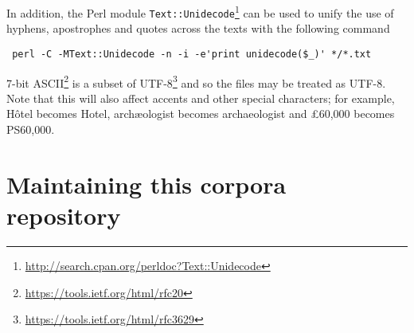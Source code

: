 \documentclass[a4paper,10pt]{paper}
\begin{document}
In addition, the Perl module \texttt{Text::Unidecode}\footnote{\url{http://search.cpan.org/perldoc?Text::Unidecode}} can be used to unify the use of hyphens, apostrophes and quotes across the texts with the following command

\begin{verbatim} perl -C -MText::Unidecode -n -i -e'print unidecode($_)' */*.txt \end{verbatim}

7-bit ASCII\footnote{\url{https://tools.ietf.org/html/rfc20}} is a subset of UTF-8\footnote{\url{https://tools.ietf.org/html/rfc3629}} and so the files may be treated as UTF-8.
Note that this will also affect accents and other special characters; for example, Hôtel becomes Hotel, archæologist becomes archaeologist and £60,000 becomes PS60,000.

\section{Maintaining this corpora repository}
\end{document}
